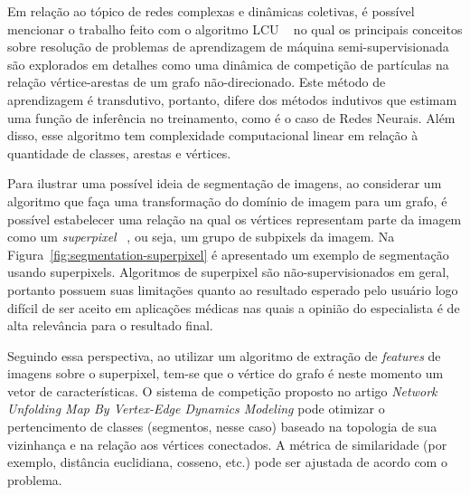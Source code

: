 Em relação ao tópico de redes complexas e dinâmicas coletivas, é
possível mencionar o trabalho feito com o algoritmo \gls{LCU}
~\cite{VerriNetworkUnfoldingMap2018} no qual os principais conceitos
sobre resolução de problemas de aprendizagem de máquina
semi-supervisionada são explorados em detalhes como uma dinâmica de
competição de partículas na relação vértice-arestas de um grafo
não-direcionado. Este método de aprendizagem é transdutivo, portanto,
difere dos métodos indutivos que estimam uma função de inferência no
treinamento, como é o caso de Redes Neurais. Além disso, esse
algoritmo tem complexidade computacional linear em relação à
quantidade de classes, arestas e vértices.

Para ilustrar uma possível ideia de segmentação de imagens, ao
considerar um algoritmo que faça uma transformação do domínio de
imagem para um grafo, é possível estabelecer uma relação na qual os
vértices representam parte da imagem como um \textit{superpixel}
~\cite{SuperpixelSurvey2020}, ou seja, um grupo de subpixels da
imagem. Na Figura~\ref{fig:segmentation-superpixel} é apresentado um
exemplo de segmentação usando superpixels. Algoritmos de superpixel
são não-supervisionados em geral, portanto possuem suas limitações
quanto ao resultado esperado pelo usuário \textendash\hfill logo
difícil de ser aceito em aplicações médicas nas quais a opinião do
especialista é de alta relevância para o resultado final.

\begin{figure}[!h]
        \captionsetup{width=9cm}
		\centering
\end{figure}



Seguindo essa perspectiva, ao utilizar um algoritmo de extração de
\textit{features} de imagens sobre o superpixel, tem-se que o vértice
do grafo é neste momento um vetor de características. O sistema de
competição proposto no artigo \textit{Network Unfolding Map By
Vertex-Edge Dynamics Modeling} pode otimizar o pertencimento de
classes (segmentos, nesse caso) baseado na topologia de sua vizinhança
e na relação aos vértices conectados. A métrica de similaridade
(por exemplo, distância euclidiana, cosseno, etc.) pode ser
ajustada de acordo com o problema.

